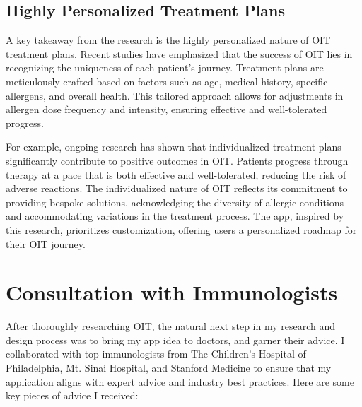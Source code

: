 \subsection{Highly Personalized Treatment Plans}

A key takeaway from the research is the highly personalized nature of OIT treatment plans. Recent studies have emphasized that the success of OIT lies in recognizing the uniqueness of each patient's journey. Treatment plans are meticulously crafted based on factors such as age, medical history, specific allergens, and overall health. This tailored approach allows for adjustments in allergen dose frequency and intensity, ensuring effective and well-tolerated progress.

For example, ongoing research has shown that individualized treatment plans significantly contribute to positive outcomes in OIT. Patients progress through therapy at a pace that is both effective and well-tolerated, reducing the risk of adverse reactions. The individualized nature of OIT reflects its commitment to providing bespoke solutions, acknowledging the diversity of allergic conditions and accommodating variations in the treatment process. The app, inspired by this research, prioritizes customization, offering users a personalized roadmap for their OIT journey.

\section{Consultation with Immunologists}

After thoroughly researching OIT, the natural next step in my research and design process was to bring my app idea to doctors, and garner their advice. I collaborated with top immunologists from The Children's Hospital of Philadelphia, Mt. Sinai Hospital, and Stanford Medicine to ensure that my application aligns with expert advice and industry best practices. Here are some key pieces of advice I received:

